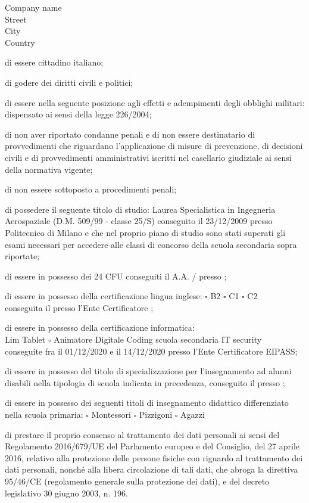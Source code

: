\begin{letter}{Company name \\ Street\\ City\\ Country}
\begin{todolist}[itemsep=1pt,parsep=0pt]
  \item[\done] di essere cittadino italiano;
	\item[\done] di godere dei diritti civili e politici; 
	\item[\done] di essere nella seguente posizione agli effetti e adempimenti degli obblighi militari: dispensato ai sensi della legge 226/2004;
	\item[\done] di non aver riportato condanne penali e di non essere destinatario di provvedimenti che riguardano l’applicazione di misure di prevenzione, di decisioni civili e di provvedimenti amministrativi iscritti nel casellario giudiziale ai sensi della normativa vigente;
	\item[\done] di non essere sottoposto a procedimenti penali;
	\item[\done] di possedere il seguente titolo di studio: Laurea Specialistica in Ingegneria Aerospaziale (D.M. 509/99 - classe 25/S) conseguito il 23/12/2009 presso Politecnico di Milano e che nel proprio piano di studio sono stati superati gli esami necessari per accedere alle classi di concorso  della scuola secondaria sopra riportate;
	\item di essere in possesso dei 24 CFU conseguiti il \dotfill A.A. \dotfill / \dotfill presso \dotfill;
	\item di essere in possesso della certificazione lingua inglese: \hfill $\square$ B2 \hfill $\square$ C1 \hfill $\square$ C2 \\
	conseguita il \dotfill presso l'Ente Certificatore \dotfill;
	\item[\done] di essere in possesso della certificazione informatica: \\
	\done Lim \hfill \done Tablet \hfill $\square$ Animatore Digitale \hfill \done Coding scuola secondaria \hfill \done IT security \\
	conseguite fra il 01/12/2020 e il 14/12/2020 presso l'Ente Certificatore EIPASS;
	\item di essere in possesso del titolo di specializzazione per l'insegnamento ad alunni disabili nella tipologia di scuola indicata in precedenza, conseguito il \dotfill presso \dotfill;
	\item di essere in possesso dei seguenti titoli di insegnamento didattico differenziato nella scuola primaria: \hspace{0.8cm} $\square$ Montessori \hspace{0.8cm} $\square$ Pizzigoni \hspace{0.8cm} $\square$ Agazzi
	\item[\done] di prestare il proprio consenso al trattamento dei dati personali ai sensi del Regolamento 2016/679/UE del Parlamento europeo e del Consiglio, del 27 aprile 2016, relativo alla protezione delle persone fisiche con riguardo al trattamento dei dati personali, nonché alla libera circolazione di tali dati, che abroga la direttiva 95/46/CE (regolamento generale sulla protezione dei dati), e del decreto legislativo 30 giugno 2003, n. 196.
\end{todolist}


\end{letter}
